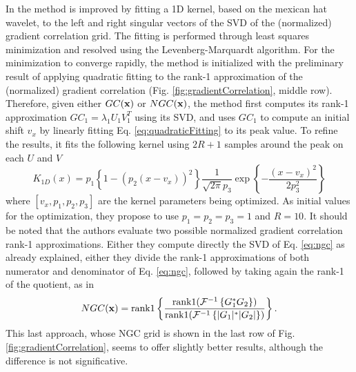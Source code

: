 In \cite{Tzimiropoulos2011} the method is improved by fitting a 1D kernel, based on the mexican hat wavelet, to the left and right singular vectors of the SVD of the (normalized) gradient correlation grid. The fitting is performed through least squares minimization and resolved using the Levenberg-Marquardt \cite{Levenberg_1944} algorithm. For the minimization to converge rapidly, the method is initialized with the preliminary result of applying quadratic fitting to the rank-1 approximation of the (normalized) gradient correlation (Fig. \ref{fig:gradientCorrelation}, middle row). Therefore, given either $GC(\mathbf{x})$ or $NGC(\mathbf{x})$, the method first computes its rank-1 approximation $GC_1 = \lambda_1U_1V_1^T$ using its SVD, and uses $GC_1$ to compute an initial shift $v_x$ by linearly fitting Eq. \eqref{eq:quadraticFitting} to its peak value. To refine the results, it fits the following kernel using $2R+1$ samples around the peak on each $U$ and $V$
\begin{equation}
	K_{1D}(x) = p_1 \left\{1 - (p_2(x-v_x))^2\right\}\frac{1}{\sqrt{2\pi}p_3} \exp\left\{-\frac{(x-v_x)^2}{2p_3^2}\right\}
\end{equation}
where $[v_x, p_1, p_2, p_3]$ are the kernel parameters being optimized. As initial values for the optimization, they propose to use $p_1 = p_2 = p_3 = 1$ and $R = 10$. It should be noted that the authors evaluate two possible normalized gradient correlation rank-1 approximations. Either they compute directly the SVD of Eq. \eqref{eq:ngc} as already explained, either they divide the rank-1 approximations of both numerator and denominator of Eq. \eqref{eq:ngc}, followed by taking again the rank-1 of the quotient, as in
\begin{equation}
	NGC(\mathbf{x}) = \text{rank1}\left\{\frac{\text{rank1}(\mathcal{F}^{-1}\left\{G_1^*G_2\right\})}{\text{rank1}(\mathcal{F}^{-1}\left\{|G_1|^*|G_2|\right\})}\right\}.
\end{equation}
This last approach, whose NGC grid is shown in the last row of Fig. \ref{fig:gradientCorrelation}, seems to offer slightly better results, although the difference is not significative. 

